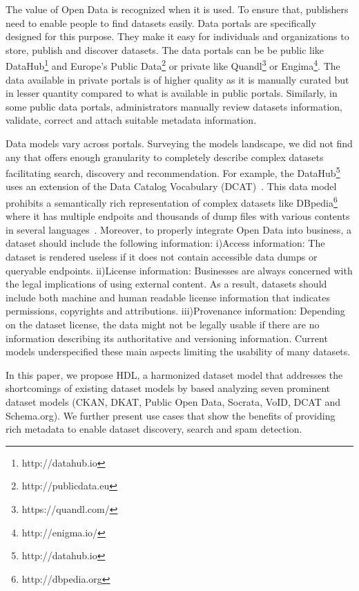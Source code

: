 \documentclass[runningheads,a4paper]{llncs}
\begin{document}
The value of Open Data is recognized when it is used. To ensure that, publishers need to enable people to find datasets easily. Data portals are specifically designed for this purpose. They make it easy for individuals and organizations to store, publish and discover datasets. The data portals can be be public like DataHub\footnote{http://datahub.io} and Europe's Public Data\footnote{http://publicdata.eu} or private like Quandl\footnote{https://quandl.com/} or Engima\footnote{http://enigma.io/}. The data available in private portals is of higher quality as it is manually curated but in lesser quantity compared to what is available in public portals. Similarly, in some public data portals, administrators manually review datasets information, validate, correct and attach suitable metadata information.

Data models vary across portals. Surveying the models landscape, we did not find any that offers enough granularity to completely describe complex datasets facilitating search, discovery and recommendation. For example, the DataHub\footnote{http://datahub.io} uses an extension of the Data Catalog Vocabulary (DCAT)~\cite{Erickson:14:DCV}. This data model prohibits a semantically rich representation of complex datasets like DBpedia\footnote{http://dbpedia.org} where it has multiple endpoits and thousands of dump files with various contents in several languages~\cite{Brummer:2014:DTS:2660517.2660538}. Moreover, to properly integrate Open Data into business, a dataset should include the following information: i)Access information: The dataset is rendered useless if it does not contain accessible data dumps or queryable endpoints. ii)License information: Businesses are always concerned with the legal implications of using external content. As a result, datasets should include both machine and human readable license information that indicates permissions, copyrights and attributions. iii)Provenance information: Depending on the dataset license, the data might not be legally usable if there are no information describing its authoritative and versioning information. Current models underspecified these main aspects limiting the usability of many datasets.

In this paper, we propose HDL, a harmonized dataset model that addresses the shortcomings of existing dataset models by based analyzing seven prominent dataset models (CKAN, DKAT, Public Open Data, Socrata, VoID, DCAT and Schema.org). We further present use cases that show the benefits of providing rich metadata to enable dataset discovery, search and spam detection.
\end{document}
